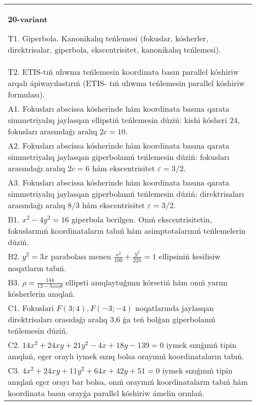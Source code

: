 \documentclass{article}
\begin{document}
\begin{tabular}{m{17cm}}
\textbf{20-variant}
\newline

T1. Giperbola. Kanonikalıq teńlemesi (fokuslar, kósherler, direktrisalar, giperbola, ekscentrisitet, kanonikalıq teńlemesi).\\

T2. ETIS-tıń ulıwma teńlemesin koordinata basın parallel kóshiriw arqalı ápiwayılastırıń (ETIS- tıń ulıwma teńlemesin parallel kóshiriw formulası).\\

A1. Fokusları abscissa kósherinde hám koordinata basına qarata simmetriyalıq jaylasqan ellipstiń teńlemesin dúziń: kishi kósheri $24$, fokusları arasındaǵı aralıq $2 c=10$.\\

A2. Fokusları abscissa kósherinde hám koordinata basına qarata simmetriyalıq jaylasqan giperbolanıń teńlemesin dúziń: fokusları arasındaǵı aralıq $2 c=6$ hám ekscentrisitet $\varepsilon=3/2$.\\

A3. Fokusları abscissa kósherinde hám koordinata basına qarata simmetriyalıq jaylasqan giperbolanıń teńlemesin dúziń: direktrisaları arasındaǵı aralıq $8/3$ hám ekscentrisitet $\varepsilon=3/2$.\\

B1. $x^{2} - 4y^{2} = 16$ giperbola berilgen. Onıń ekscentrisitetin, fokuslarınıń koordinataların tabıń hám asimptotalarınıń teńlemelerin dúziń.\\

B2. $y^{2} = 3x$ parabolası menen $\frac{x^{2}}{100} + \frac{y^{2}}{225} = 1$ ellipsiniń kesilisiw noqatların tabıń.  \\

B3. $\rho = \frac{144}{13 - 5cos\theta}$ ellipsti anıqlaytuǵının kórsetiń hám onıń yarım kósherlerin anıqlań.\\

C1. Fokuslari $F(3;4), F(-3;-4)$ noqatlarında jaylasqan direktrisaları orasıdaǵı aralıq 3,6 ǵa teń bolǵan giperbolanıń teńlemesin dúziń.  \\

C2. $14x^{2} + 24xy + 21y^{2} - 4x + 18y - 139 = 0$ iymek sızıǵınıń tipin anıqlań, eger oraylı iymek sızıq bolsa orayınıń koordinataların tabıń.  \\

C3. $4x^{2} + 24xy + 11y^{2} + 64x + 42y + 51 = 0$ iymek sızıǵınıń tipin anıqlań eger orayı bar bolsa, onıń orayınıń koordinataların tabıń hám koordinata basın orayǵa parallel kóshiriw ámelin orınlań.  \\

\end{tabular}
\vspace{1cm}
\end{document}
